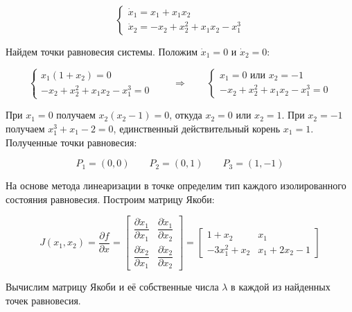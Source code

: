 \documentclass[a4paper,12pt]{article}
\begin{document}
\begin{equation} \label{sys:task1_2}
	\begin{cases}
		\dot{x}_1 = x_1 + x_1 x_2 \\
		\dot{x}_2 = -x_2 + x_2^2 + x_1 x_2 - x_1^3
	\end{cases}
\end{equation}

Найдем точки равновесия системы. Положим \(\dot{x}_1 = 0 \text{ и } \dot{x}_2 = 0\):

\[
\begin{cases}
	x_1(1 + x_2) = 0 \\
	-x_2 + x_2^2 + x_1 x_2 - x_1^3 = 0
\end{cases} 
\qquad \Longrightarrow \qquad
\begin{cases}
	x_1 = 0 \text{ или } x_2 = -1 \\
	-x_2 + x_2^2 + x_1 x_2 - x_1^3 = 0
\end{cases}
\]

При \(x_1 = 0\) получаем \(x_2(x_2 - 1) = 0\), откуда \(x_2 = 0\) или \(x_2 = 1\). При \(x_2 = -1\) получаем \(x_1^3 + x_1 - 2 = 0\), единственный действительный корень \(x_1 = 1\). Полученные точки равновесия:

\[
P_1 = (0, 0) \qquad P_2 = (0, 1) \qquad P_3 = (1, -1) 
\]

На основе метода линеаризации в точке определим тип каждого изолированного состояния равновесия. Построим матрицу Якоби:

\[
J(x_1, x_2) = \frac{\partial f}{\partial x} = 
\begin{bmatrix}
	\dfrac{\partial \dot{x}_1}{\partial x_1} & \dfrac{\partial \dot{x}_1}{\partial x_2} \\[10pt]
	\dfrac{\partial \dot{x}_2}{\partial x_1} & \dfrac{\partial \dot{x}_2}{\partial x_2}
\end{bmatrix} = 
\begin{bmatrix}
	1 + x_2 & x_1 \\
	-3x_1^2 + x_2 & x_1 + 2x_2 - 1
\end{bmatrix}
\]

Вычислим матрицу Якоби и её собственные числа $\lambda$ в каждой из найденных точек равновесия.
\end{document}
